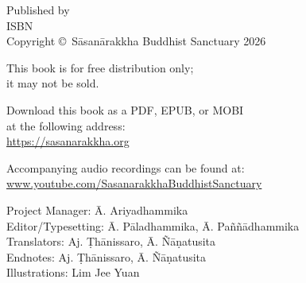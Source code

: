 
\cleartoverso
\thispagestyle{empty}

{%

	\ifafiveversion \fontsize{10}{16}\selectfont \fi
	\ifninebythirteenversion \fontsize{7.5}{11}\selectfont \fi
	\centering
	\setlength{\parindent}{0pt}%

	\ifafiveversion \vspace{0.5cm} \fi
	\ifninebythirteenversion \vspace{0.15cm} \fi

	Published by \publisher\\

	ISBN \theISBN\\
	Copyright \copyright\ Sāsanārakkha Buddhist Sanctuary 2026

	\ifafiveversion \vspace{0.5cm} \fi
	\ifninebythirteenversion \vspace{0.25cm} \fi

	This book is for free distribution only;\\
	it may not be sold.

	\ifafiveversion \vspace{0.5cm} \fi
	\ifninebythirteenversion \vspace{0.25cm} \fi

	Download this book as a PDF, EPUB, or MOBI\\
	at the following address:\\
	\href{https://sasanarakkha.org/}{https://sasanarakkha.org}

	Accompanying audio recordings can be found at: 
	\href{www.youtube.com/SasanarakkhaBuddhistSanctuary}{www.youtube.com/SasanarakkhaBuddhistSanctuary}

	\ifafiveversion \vspace{0.5cm} \fi
	\ifninebythirteenversion \vspace{0.25cm} \fi

	Project Manager: Ā. Ariyadhammika\\
	Editor/Typesetting: Ā. Pāladhammika, Ā. Paññādhammika\\
	Translators: Aj. Ṭhānissaro, Ā. Ñāṇatusita\\
	Endnotes: Aj. Ṭhānissaro, Ā. Ñāṇatusita\\
	Illustrations: Lim Jee Yuan

	\ifafiveversion \vspace{0.5cm} \fi
	\ifninebythirteenversion \vspace{0.25cm} \fi

}

